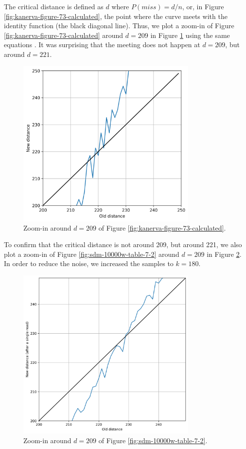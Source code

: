 The critical distance is defined as $d$ where $P(miss) = d/n$, or, in Figure \ref{fig:kanerva-figure-73-calculated}, the point where the curve meets with the identity function (the black diagonal line). Thus, we plot a zoom-in of Figure \ref{fig:kanerva-figure-73-calculated} around $d=209$ in Figure \ref{fig:figure-73-eq-zoom-in} using the same equations \citep{brogliato2014sparse}. It was surprising that the meeting does not happen at $d=209$, but around $d=221$.

\begin{figure}[!htb]
\centering\includegraphics[width=0.8\textwidth]{./images02/figure-73-eq-zoom.png}
\caption{Zoom-in around $d=209$ of Figure \ref{fig:kanerva-figure-73-calculated}.
\label{fig:figure-73-eq-zoom-in}
}
\end{figure}

To confirm that the critical distance is not around 209, but around 221, we also plot a zoom-in of Figure \ref{fig:sdm-10000w-table-7-2} around $d=209$ in Figure \ref{fig:sdm-10000w-zoom}. In order to reduce the noise, we increased the samples to $k=180$.

\begin{figure}[!htb]
\centering\includegraphics[width=0.8\textwidth]{./images02/sdm-10000w-zoom-209.png}
\caption{Zoom-in around $d=209$ of Figure \ref{fig:sdm-10000w-table-7-2}.
\label{fig:sdm-10000w-zoom}
}
\end{figure}


